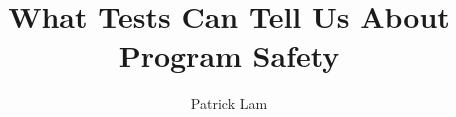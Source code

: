 \documentclass[sigplan,screen]{acmart}\settopmatter{}
\begin{document}
	
	\title{What Tests Can Tell Us About Program Safety}         %
	
	
	
	\author{Patrick Lam}
	
	\begin{abstract}
          
	\end{abstract}
	
	\maketitle
	
\end{document}
